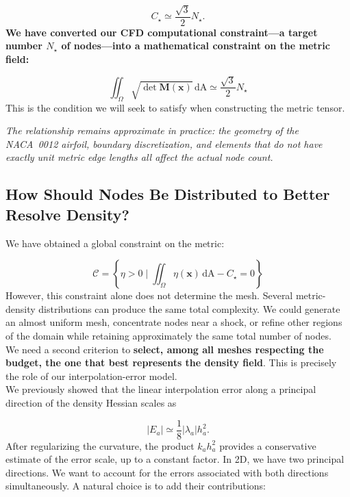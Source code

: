 \documentclass[11pt,a4paper]{article}
\begin{document}
\begin{equation}
\boxed{
C_\star\simeq\frac{\sqrt{3}}{2}N_\star.
}
\end{equation}
\noindent
\textbf{We have converted our CFD computational constraint---a target number $N_\star$ of nodes---into a mathematical constraint on the metric field:}

\begin{equation}
\iint_\Omega\sqrt{\det\mathbf M(\mathbf x)}\,\mathrm{dA}
\simeq\frac{\sqrt{3}}{2}N_\star
\end{equation}
\noindent
This is the condition we will seek to satisfy when constructing the metric tensor.


\noindent
\textit{The relationship remains approximate in practice: the geometry of the NACA~0012 airfoil, boundary discretization, and elements that do not have exactly unit metric edge lengths all affect the actual node count.}


\subsection{How Should Nodes Be Distributed to Better Resolve Density?}

We have obtained a global constraint on the metric:

\begin{equation}
\boxed{
\mathscr{C}=\left\{\eta>0 \mid \iint_\Omega\eta(\mathbf x)\,\mathrm{dA}-C_\star=0\right\}
}
\end{equation}
\noindent
However, this constraint alone does not determine the mesh. Several metric-density distributions can produce the same total complexity. We could generate an almost uniform mesh, concentrate nodes near a shock, or refine other regions of the domain while retaining approximately the same total number of nodes.\\

\noindent
We  need a second criterion to \textbf{select, among all meshes respecting the budget, the one that best represents the density field}. This is precisely the role of our interpolation-error model.\\

\noindent
We previously showed that the linear interpolation error along a principal direction of the density Hessian scales as

\begin{equation*}
|E_a|\simeq\frac18|\lambda_a|h_a^2.
\end{equation*}
\noindent
After regularizing the curvature, the product $k_a h_a^2$ provides a conservative estimate of the error scale, up to a constant factor. In 2D, we have two principal directions. We want to account for the errors associated with both directions simultaneously. A natural choice is to add their contributions:
\end{document}
